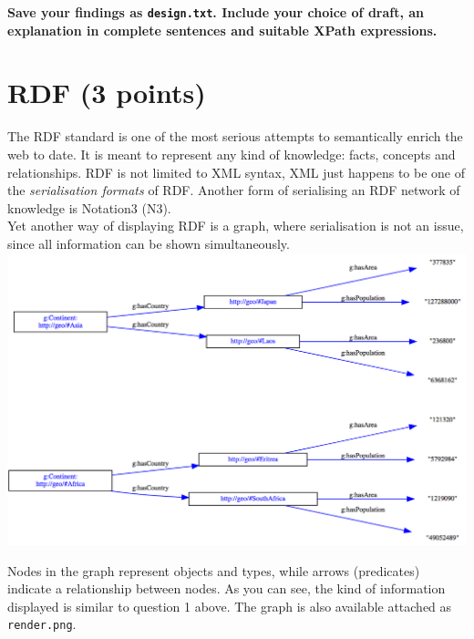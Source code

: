 \documentclass[a4paper, 12pt]{scrartcl}
\begin{document}
\noindent \textbf{Save your findings as \texttt{design.txt}. Include your choice of draft, an explanation in complete sentences and suitable XPath expressions.}

\section{RDF (3 points)}

The RDF standard is one of the most serious attempts to semantically enrich the web to date. It is meant to represent any kind of knowledge: facts, concepts and relationships. RDF is not limited to XML syntax, XML just happens to be one of the \textit{serialisation formats} of RDF. Another form of serialising an RDF network of knowledge is Notation3 (N3). \\

\noindent Yet another way of displaying RDF is a graph, where serialisation is not an issue, since all information can be shown simultaneously.\\

\includegraphics[width=17cm]{attachments/render.png}
\vspace{0.5cm}

\noindent Nodes in the graph represent objects and types, while arrows (predicates) indicate a relationship between nodes. As you can see, the kind of information displayed is similar to question 1 above. The graph is also available attached as \texttt{render.png}. \\
\end{document}
